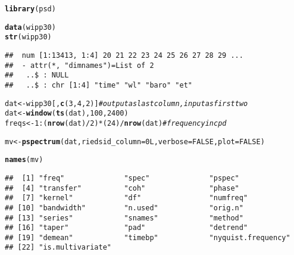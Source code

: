 \documentclass[11pt]{article}\usepackage[]{graphicx}\usepackage[]{color}
\makeatletter
\newcommand{\hlnum}[1]{\textcolor[rgb]{0.686,0.059,0.569}{#1}}%
\newcommand{\hlcom}[1]{\textcolor[rgb]{0.678,0.584,0.686}{\textit{#1}}}%
\newcommand{\hlopt}[1]{\textcolor[rgb]{0,0,0}{#1}}%
\newcommand{\hlstd}[1]{\textcolor[rgb]{0.345,0.345,0.345}{#1}}%
\newcommand{\hlkwb}[1]{\textcolor[rgb]{0.69,0.353,0.396}{#1}}%
\newcommand{\hlkwc}[1]{\textcolor[rgb]{0.333,0.667,0.333}{#1}}%
\newcommand{\hlkwd}[1]{\textcolor[rgb]{0.737,0.353,0.396}{\textbf{#1}}}%
\newenvironment{kframe}{%
 \def\at@end@of@kframe{}%
 \ifinner\ifhmode%
  \def\at@end@of@kframe{\end{minipage}}%
  \begin{minipage}{\columnwidth}%
 \fi\fi%
 \def\FrameCommand##1{\hskip\@totalleftmargin \hskip-\fboxsep
 \colorbox{shadecolor}{##1}\hskip-\fboxsep
     \hskip-\linewidth \hskip-\@totalleftmargin \hskip\columnwidth}%
 \MakeFramed {\advance\hsize-\width
   \@totalleftmargin\z@ \linewidth\hsize
   \@setminipage}}%
 {\par\unskip\endMakeFramed%
 \at@end@of@kframe}
\newenvironment{knitrout}{}{} %
\makeatother
\begin{document}
\begin{knitrout}
\color{fgcolor}\begin{kframe}
\begin{alltt}
\hlkwd{library}\hlstd{(psd)}
\end{alltt}


{\ttfamily\noindent\itshape\color{messagecolor}{\#\# Loaded psd (2.1.0) -- Adaptive multitaper spectrum estimation; to start, see ?pspectrum}}\begin{alltt}
\hlkwd{data}\hlstd{(wipp30)}
\hlkwd{str}\hlstd{(wipp30)}
\end{alltt}
\begin{verbatim}
##  num [1:13413, 1:4] 20 21 22 23 24 25 26 27 28 29 ...
##  - attr(*, "dimnames")=List of 2
##   ..$ : NULL
##   ..$ : chr [1:4] "time" "wl" "baro" "et"
\end{verbatim}
\begin{alltt}
\hlstd{dat} \hlkwb{<-} \hlstd{wipp30[,} \hlkwd{c}\hlstd{(}\hlnum{3}\hlstd{,}\hlnum{4}\hlstd{,}\hlnum{2}\hlstd{)]} \hlcom{# output as last column, input as first two}
\hlstd{dat} \hlkwb{<-} \hlkwd{window}\hlstd{(}\hlkwd{ts}\hlstd{(dat),} \hlnum{100}\hlstd{,} \hlnum{2400}\hlstd{)}
\hlstd{freqs} \hlkwb{<-} \hlnum{1}\hlopt{:}\hlstd{(}\hlkwd{nrow}\hlstd{(dat)}\hlopt{/}\hlnum{2}\hlstd{)} \hlopt{*} \hlstd{(}\hlnum{24}\hlstd{)} \hlopt{/} \hlkwd{nrow}\hlstd{(dat)} \hlcom{# frequency in cpd}
\end{alltt}
\end{kframe}
\end{knitrout}

\begin{knitrout}
\color{fgcolor}\begin{kframe}
\begin{alltt}
\hlstd{mv} \hlkwb{<-} \hlkwd{pspectrum}\hlstd{(dat,} \hlkwc{riedsid_column}\hlstd{=} \hlnum{0L}\hlstd{,} \hlkwc{verbose} \hlstd{=} \hlnum{FALSE}\hlstd{,} \hlkwc{plot} \hlstd{=} \hlnum{FALSE}\hlstd{)}
\end{alltt}
\end{kframe}
\end{knitrout}


\begin{knitrout}
\color{fgcolor}\begin{kframe}
\begin{alltt}
\hlkwd{names}\hlstd{(mv)}
\end{alltt}
\begin{verbatim}
##  [1] "freq"              "spec"              "pspec"            
##  [4] "transfer"          "coh"               "phase"            
##  [7] "kernel"            "df"                "numfreq"          
## [10] "bandwidth"         "n.used"            "orig.n"           
## [13] "series"            "snames"            "method"           
## [16] "taper"             "pad"               "detrend"          
## [19] "demean"            "timebp"            "nyquist.frequency"
## [22] "is.multivariate"
\end{verbatim}
\end{kframe}
\end{knitrout}
\end{document}
